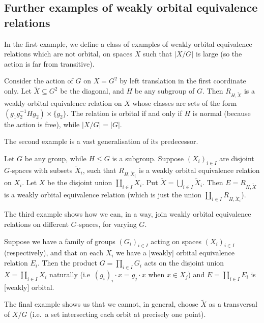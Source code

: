 	\subsection*{Further examples of weakly orbital equivalence relations}
	\label{ssec:worb_ex}
	In the first example, we define a class of examples of weakly orbital equivalence relations which are not orbital, on spaces $X$ such that $\lvert X/G\rvert$ is large (so the action is far from transitive).
	\begin{ex}
		Consider the action of $G$ on $X=G^2$ by left translation in the first coordinate only. Let $\tilde X\subseteq G^2$ be the diagonal, and $H$ be any subgroup of $G$. Then $R_{H,\tilde X}$ is a weakly orbital equivalence relation on $X$ whose classes are sets of the form $(g_1g_2^{-1}Hg_2)\times \{g_2\}$. The relation is orbital if and only if $H$ is normal (because the action is free), while $\lvert X/G\rvert=\lvert G\rvert$.\xqed{\lozenge}
	\end{ex}
	
	The second example is a vast generalisation of its predecessor.
	
	\begin{ex}
		\label{ex:separate_orbits}
		Let $G$ be any group, while $H\leq G$ is a subgroup. Suppose $(X_i)_{i \in I}$ are disjoint $G$-spaces with subsets $\tilde X_i$, such that $R_{H,\tilde X_i}$ is a weakly orbital equivalence relation on $X_i$. Let $X$ be the disjoint union $\coprod_{i\in I} X_i$. Put $\tilde X=\bigcup_{i\in I}\tilde X_i$. Then $E=R_{H,\tilde X}$ is a weakly orbital equivalence relation (which is just the union $\coprod_{i\in I} R_{H,\tilde X_i}$).\xqed{\lozenge}
	\end{ex}
	
	The third example shows how we can, in a way, join weakly orbital equivalence relations on different $G$-spaces, for varying $G$.
	
	\begin{ex}
		Suppose we have a family of groups $(G_i)_{i\in I}$ acting on spaces $(X_i)_{i\in I}$ (respectively), and that on each $X_i$ we have a [weakly] orbital equivalence relation $E_i$. Then the product $G=\prod_{i\in I}G_i$ acts on the disjoint union $X=\coprod_{i\in I}X_i$ naturally (i.e\ $(g_i)_i\cdot x=g_j\cdot x$ when $x\in X_j$) and $E=\coprod_{i\in I} E_i$ is [weakly] orbital.\xqed{\lozenge}
	\end{ex}
	
	The final example shows us that we cannot, in general, choose $\tilde X$ as a transversal of $X/G$ (i.e.\ a set intersecting each orbit at precisely one point).
	
